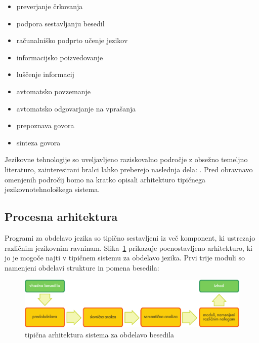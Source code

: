 \begin{multicols}{2}
\begin{itemize}
\item preverjanje črkovanja
\item podpora sestavljanju besedil
\item računalniško podprto učenje jezikov
\item informacijsko poizvedovanje
\item luščenje informacij
\item avtomatsko povzemanje
\item avtomatsko odgovarjanje na vprašanja
\item prepoznava govora
\item sinteza govora
\end{itemize}

Jezikovne tehnologije so uveljav\-ljeno raziskovalno področje z obsežno temeljno literaturo, zainteresirani bralci lahko preberejo naslednja dela: \cite{carstensen-etal1, jurafsky-martin01, manning-schuetze1, lt-world1, lt-survey1}. Pred obravnavo omenjenih področij bomo na kratko opisali arhitekturo tipičnega jezikovnotehnološkega sistema.

\subsection{Procesna arhitektura}

Programi za obdelavo jezika so tipično sestav\-ljeni iz več komponent, ki ustrezajo različnim jezikovnim ravninam. Slika~\ref{fig:textprocessingarch_de} prikazuje poenostav\-ljeno arhitekturo, ki jo je mogoče najti v tipičnem sistemu za obdelavo jezika. Prvi trije moduli so namenjeni obdelavi strukture in pomena besedila:

\begin{figure}[hb]
  \center
  \includegraphics[width=\textwidth]{../_media/slovene/text_processing_app_architecture}
  \caption{tipična arhitektura sistema za obdelavo besedila}
  \label{fig:textprocessingarch_de}
\end{figure}


\end{multicols}

